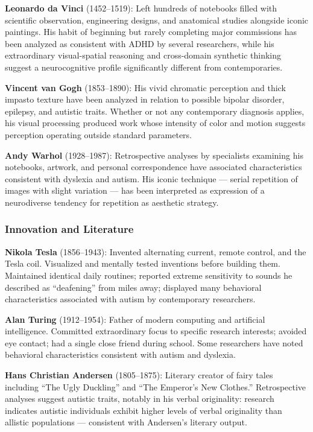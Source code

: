 \documentclass[11pt,letterpaper]{article}
\begin{document}
\textbf{Leonardo da Vinci} (1452--1519): Left hundreds of notebooks filled with scientific observation, engineering designs, and anatomical studies alongside iconic paintings. His habit of beginning but rarely completing major commissions has been analyzed as consistent with ADHD by several researchers, while his extraordinary visual-spatial reasoning and cross-domain synthetic thinking suggest a neurocognitive profile significantly different from contemporaries.

\textbf{Vincent van Gogh} (1853--1890): His vivid chromatic perception and thick impasto texture have been analyzed in relation to possible bipolar disorder, epilepsy, and autistic traits. Whether or not any contemporary diagnosis applies, his visual processing produced work whose intensity of color and motion suggests perception operating outside standard parameters.

\textbf{Andy Warhol} (1928--1987): Retrospective analyses by specialists examining his notebooks, artwork, and personal correspondence have associated characteristics consistent with dyslexia and autism. His iconic technique --- serial repetition of images with slight variation --- has been interpreted as expression of a neurodiverse tendency for repetition as aesthetic strategy.

\subsubsection{Innovation and Literature}

\textbf{Nikola Tesla} (1856--1943): Invented alternating current, remote control, and the Tesla coil. Visualized and mentally tested inventions before building them. Maintained identical daily routines; reported extreme sensitivity to sounds he described as ``deafening'' from miles away; displayed many behavioral characteristics associated with autism by contemporary researchers.

\textbf{Alan Turing} (1912--1954): Father of modern computing and artificial intelligence. Committed extraordinary focus to specific research interests; avoided eye contact; had a single close friend during school. Some researchers have noted behavioral characteristics consistent with autism and dyslexia.

\textbf{Hans Christian Andersen} (1805--1875): Literary creator of fairy tales including ``The Ugly Duckling'' and ``The Emperor's New Clothes.'' Retrospective analyses suggest autistic traits, notably in his verbal originality: research indicates autistic individuals exhibit higher levels of verbal originality than allistic populations --- consistent with Andersen's literary output.
\end{document}
